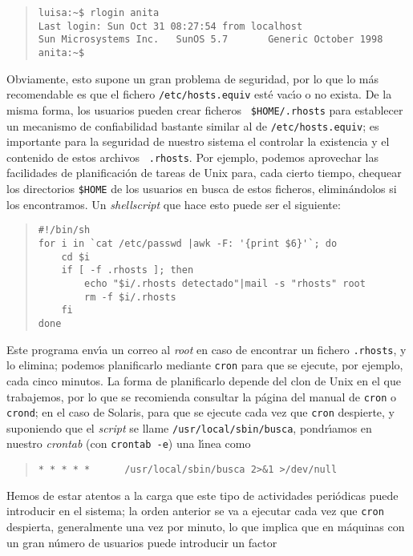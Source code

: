 \begin{itemize}
\begin{quote}
\begin{verbatim}
luisa:~$ rlogin anita
Last login: Sun Oct 31 08:27:54 from localhost
Sun Microsystems Inc.   SunOS 5.7       Generic October 1998
anita:~$
\end{verbatim}
\end{quote}
\rm
Obviamente, esto supone un gran problema de seguridad, por lo que lo m\'as
recomendable es que el fichero {\tt /etc/hosts.equiv} est\'e vac\'{\i}o o no
exista. De la misma forma, los usuarios pueden crear ficheros {\tt
\$HOME/.rhosts} para establecer un mecanismo de confiabilidad bastante similar
al de {\tt /etc/hosts.equiv}; es importante para la seguridad de nuestro
sistema el controlar la existencia y el contenido de estos archivos {\tt
.rhosts}. Por ejemplo, podemos aprovechar las facilidades de planificaci\'on de
tareas de Unix para, cada cierto tiempo, chequear los directorios {\tt \$HOME}
de los usuarios en busca de estos ficheros, elimin\'andolos si los
encontramos. Un {\it shellscript} que hace esto puede ser el siguiente:
\tt
\begin{quote}
\begin{verbatim}
#!/bin/sh
for i in `cat /etc/passwd |awk -F: '{print $6}'`; do
    cd $i
    if [ -f .rhosts ]; then
        echo "$i/.rhosts detectado"|mail -s "rhosts" root
        rm -f $i/.rhosts
    fi
done
\end{verbatim}
\end{quote}
\rm
Este programa env\'{\i}a un correo al {\it root} en caso de encontrar un
fichero {\tt .rhosts}, y lo elimina; podemos planificarlo mediante {\tt cron}
para que se ejecute, por ejemplo, cada cinco minutos. La forma de planificarlo
depende del clon de Unix en el que trabajemos, por lo que se recomienda
consultar la p\'agina del manual de {\tt cron} o {\tt crond}; en el caso de
Solaris, para que se ejecute cada vez que {\tt cron} despierte, y suponiendo
que el {\it script} se llame {\tt /usr/local/sbin/busca}, pondr\'{\i}amos
en nuestro {\it crontab} (con {\tt crontab -e}) una l\'{\i}nea como
\tt
\begin{quote}
\begin{verbatim}
* * * * *      /usr/local/sbin/busca 2>&1 >/dev/null
\end{verbatim}
\end{quote}
\rm
Hemos de estar atentos a la carga que este tipo de actividades peri\'odicas 
puede introducir en el sistema; la orden anterior se va a ejecutar cada vez
que {\tt cron} despierta, generalmente una vez por minuto, lo que implica que
en m\'aquinas con un gran n\'umero de usuarios puede introducir un factor 

\end{itemize}
